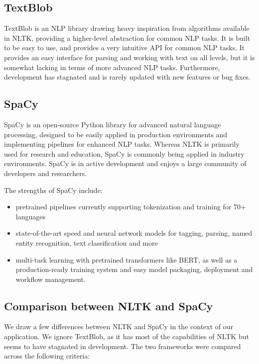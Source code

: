 \subsection*{TextBlob}
TextBlob is an NLP library drawing heavy inspiration from algorithms available in NLTK, providing a higher-level abstraction for common NLP tasks. It is built to be easy to use, and provides a very intuitive API for common NLP tasks. It provides an easy interface for parsing and working with text on all levels, but it is somewhat lacking in terms of more advanced NLP tasks. Furthermore, development has stagnated and is rarely updated with new features or bug fixes.

\subsection*{SpaCy}
SpaCy is an open-source Python library for advanced natural language processing, designed to be easily applied in production environments and implementing pipelines for enhanced NLP tasks. Whereas NLTK is primarily used for research and education, SpaCy is commonly being applied in industry environments. SpaCy is in active development and enjoys a large community of developers and researchers.

The strengths of SpaCy include:
\begin{itemize}
    \item pretrained pipelines currently supporting tokenization and training for 70+ languages
    \item state-of-the-art speed and neural network models for tagging, parsing, named entity recognition, text classification and more
    \item multi-task learning with pretrained transformers like BERT, as well as a production-ready training system and easy model packaging, deployment and workflow management.
\end{itemize}

\subsection*{Comparison between NLTK and SpaCy}

We draw a few differences between NLTK and SpaCy in the context of our application. We ignore TextBlob, as it has most of the capabilities of NLTK but seems to have stagnated in development. The two frameworks were compared across the following criteria:

